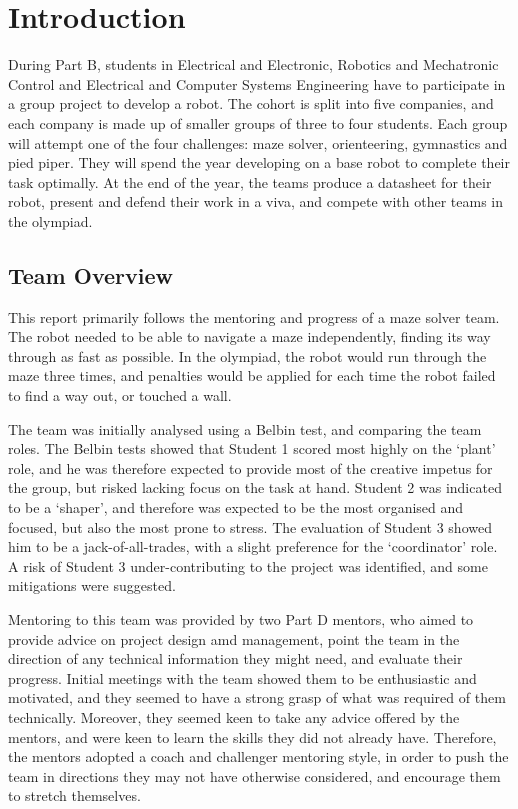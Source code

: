 
\section{Introduction}\label{sec:introduction}
    During Part B, students in Electrical and Electronic, Robotics and Mechatronic Control and Electrical and Computer Systems Engineering have to participate in a group project to develop a robot.
    The cohort is split into five companies, and each company is made up of smaller groups of three to four students.
    Each group will attempt one of the four challenges: maze solver, orienteering, gymnastics and pied piper.
    They will spend the year developing on a base robot to complete their task optimally.
    At the end of the year, the teams produce a datasheet for their robot, present and defend their work in a viva, and compete with other teams in the olympiad.


    \subsection{Team Overview}\label{subsec:intro-team}
    This report primarily follows the mentoring and progress of a maze solver team.
    The robot needed to be able to navigate a maze independently, finding its way through as fast as possible.
    In the olympiad, the robot would run through the maze three times, and penalties would be applied for each time the robot failed to find a way out, or touched a wall.

    The team was initially analysed using a Belbin test, and comparing the team roles. %
    The Belbin tests showed that Student 1 scored most highly on the `plant' role, and he was therefore expected to provide most of the creative impetus for the group, but risked lacking focus on the task at hand.
    Student 2 was indicated to be a `shaper', and therefore was expected to be the most organised and focused, but also the most prone to stress.
    The evaluation of Student 3 showed him to be a jack-of-all-trades, with a slight preference for the `coordinator' role.
    A risk of Student 3 under-contributing to the project was identified, and some mitigations were suggested.

    Mentoring to this team was provided by two Part D mentors, who aimed to provide advice on project design amd management, point the team in the direction of any technical information they might need, and evaluate their progress.
    Initial meetings with the team showed them to be enthusiastic and motivated, and they seemed to have a strong grasp of what was required of them technically.
    Moreover, they seemed keen to take any advice offered by the mentors, and were keen to learn the skills they did not already have.
    Therefore, the mentors adopted a coach and challenger mentoring style, in order to push the team in directions they may not have otherwise considered, and encourage them to stretch themselves.
%
%
%
